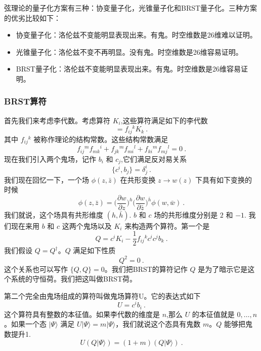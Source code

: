 
弦理论的量子化方案有三种：协变量子化，光锥量子化和BRST量子化。三种方案的优劣比较如下：
\begin{itemize}
\item 协变量子化：洛伦兹不变能明显表现出来。有鬼。时空维数是26维难以证明。
\item 光锥量子化：洛伦兹不变不再明显。没有鬼。时空维数是26维容易证明。
\item BRST量子化：洛伦兹不变能明显表现出来。有鬼。时空维数是26维容易证明。
\end{itemize}
\subsubsection{BRST算符}
首先我们来考虑李代数。考虑算符 $K_i$,这些算符满足如下的李代数
\begin{equation}
[K_i,K_j] = f_{ij}{}^k K_k~.
\end{equation}
其中 $f_{ij}{}^k$ 被称作理论的结构常数。这些结构常数满足
\begin{equation}
f_{ij}{}^m f_{mk}{}^i + f_{jk}{}^m f_{mi}{}^l+f_{ki}{}^m f_{mj}{}^l = 0 ~. 
\end{equation}
现在我们引入两个鬼场，记作 $b_i$ 和 $c_j$,它们满足反对易关系
\begin{equation}\label{eq_BRST_5}
\{ c^i, b_j \} = \delta^i_j~.
\end{equation}
我们现在回忆一下，一个场 $\phi(z,\bar z)$ 在共形变换 $z\rightarrow w(z)$ 下具有如下变换的时候
\begin{equation}
\phi(z,\bar z) = \bigg( \frac{\partial w}{\partial z} \bigg)^h \bigg( \frac{\partial w}{\partial \bar z} \bigg)^{\bar h} \phi (w,\bar w)~.
\end{equation}
我们就说，这个场具有共形维度 $(h,\bar h)$. $b$ 和 $c$ 场的共形维度分别是 $2$ 和 $-1$. 我们现在来用 $b$ 和 $c$ 这两个鬼场以及 $K_i$ 来构造两个算符。第一个是
\begin{equation}
Q = c^i K_i - \frac{1}{2} f_{ij}{}^k c^i c^j b_k~.
\end{equation}
我们假设 $Q = Q^\dagger$。$Q$ 满足如下性质
\begin{equation}
Q^2 = 0~.
\end{equation}
这个关系也可以写作 $\{Q,Q\}=0$。我们把BRST的算符记作 $Q$ 是为了暗示它是这个系统的守恒荷。我们把这叫做BRST荷。

第二个完全由鬼场组成的算符叫做鬼场算符U。它的表达式如下
\begin{equation}\label{eq_BRST_1}
U = c^i b_i~.
\end{equation}
这个算符具有整数的本征值。如果李代数的维度是 $n$,那么 $U$ 的本征值就是 $0,\ldots ,n$。如果一个态 $|\Psi\rangle$ 满足 $U|\Psi\rangle=m|\Psi\rangle$，我们就说这个态具有鬼数 $m$。$Q$ 能够把鬼数提升1.
\begin{equation}
U (Q|\Psi\rangle) = (1+m) (Q|\Psi\rangle)~. 
\end{equation}
